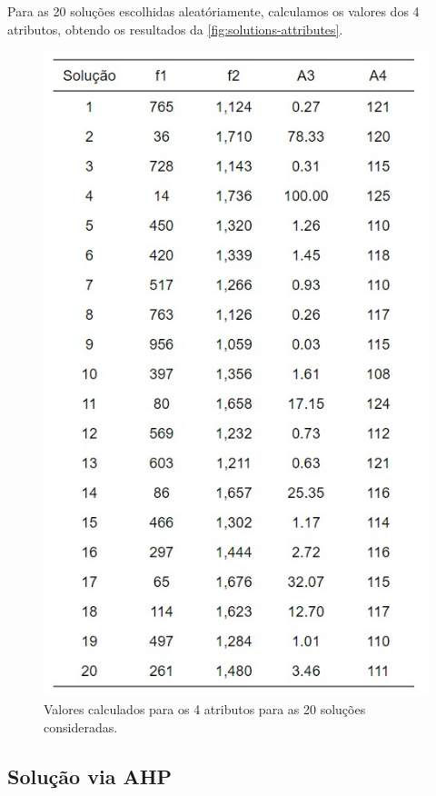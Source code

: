 \documentclass[conference]{IEEEtran}
\begin{document}
Para as 20 soluções escolhidas aleatóriamente, calculamos os valores dos 4 atributos, 
obtendo os resultados da \autoref{fig:solutions-attributes}.

\begin{figure}[htbp]
    \centering
    \includegraphics[width=\columnwidth,trim=1 1 1 1,clip]{../images/solutions-attributes.png}
    \caption{\label{fig:solutions-attributes}
	Valores calculados para os 4 atributos para as 20 soluções consideradas.}
\end{figure}

\subsection{Solução via AHP}
\end{document}
